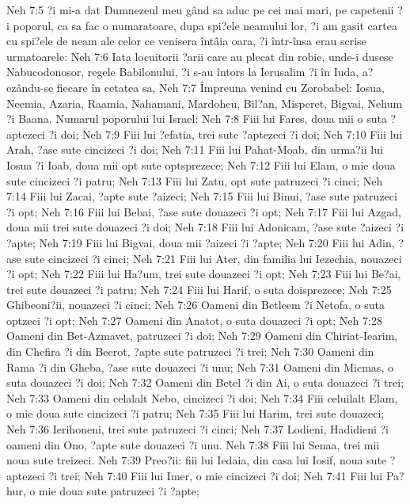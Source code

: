 Neh 7:5  ?i mi-a dat Dumnezeul meu gând sa aduc pe cei mai mari, pe capetenii ?i poporul, ca sa fac o numaratoare, dupa spi?ele neamului lor, ?i am gasit cartea cu spi?ele de neam ale celor ce venisera întâia oara, ?i într-însa erau scrise urmatoarele:
Neh 7:6  Iata locuitorii ?arii care au plecat din robie, unde-i dusese Nabucodonosor, regele Babilonului, ?i s-au întors la Ierusalim ?i în Iuda, a?ezându-se fiecare în cetatea sa,
Neh 7:7  Împreuna venind cu Zorobabel: Iosua, Neemia, Azaria, Raamia, Nahamani, Mardoheu, Bil?an, Misperet, Bigvai, Nehum ?i Baana. Numarul poporului lui Israel:
Neh 7:8  Fiii lui Fares, doua mii o suta ?aptezeci ?i doi;
Neh 7:9  Fiii lui ?efatia, trei sute ?aptezeci ?i doi;
Neh 7:10  Fiii lui Arah, ?ase sute cincizeci ?i doi;
Neh 7:11  Fiii lui Pahat-Moab, din urma?ii lui Iosua ?i Ioab, doua mii opt sute optsprezece;
Neh 7:12  Fiii lui Elam, o mie doua sute cincizeci ?i patru;
Neh 7:13  Fiii lui Zatu, opt sute patruzeci ?i cinci;
Neh 7:14  Fiii lui Zacai, ?apte sute ?aizeci;
Neh 7:15  Fiii lui Binui, ?ase sute patruzeci ?i opt;
Neh 7:16  Fiii lui Bebai, ?ase sute douazeci ?i opt;
Neh 7:17  Fiii lui Azgad, doua mii trei sute douazeci ?i doi;
Neh 7:18  Fiii lui Adonicam, ?ase sute ?aizeci ?i ?apte;
Neh 7:19  Fiii lui Bigvai, doua mii ?aizeci ?i ?apte;
Neh 7:20  Fiii lui Adin, ?ase sute cincizeci ?i cinci;
Neh 7:21  Fiii lui Ater, din familia lui Iezechia, nouazeci ?i opt;
Neh 7:22  Fiii lui Ha?um, trei sute douazeci ?i opt;
Neh 7:23  Fiii lui Be?ai, trei sute douazeci ?i patru;
Neh 7:24  Fiii lui Harif, o suta doisprezece;
Neh 7:25  Ghibeoni?ii, nouazeci ?i cinci;
Neh 7:26  Oameni din Betleem ?i Netofa, o suta optzeci ?i opt;
Neh 7:27  Oameni din Anatot, o suta douazeci ?i opt;
Neh 7:28  Oameni din Bet-Azmavet, patruzeci ?i doi;
Neh 7:29  Oameni din Chiriat-Iearim, din Chefira ?i din Beerot, ?apte sute patruzeci ?i trei;
Neh 7:30  Oameni din Rama ?i din Gheba, ?ase sute douazeci ?i unu;
Neh 7:31  Oameni din Micmas, o suta douazeci ?i doi;
Neh 7:32  Oameni din Betel ?i din Ai, o suta douazeci ?i trei;
Neh 7:33  Oameni din celalalt Nebo, cincizeci ?i doi;
Neh 7:34  Fiii celuilalt Elam, o mie doua sute cincizeci ?i patru;
Neh 7:35  Fiii lui Harim, trei sute douazeci;
Neh 7:36  Ierihoneni, trei sute patruzeci ?i cinci;
Neh 7:37  Lodieni, Hadidieni ?i oameni din Ono, ?apte sute douazeci ?i unu.
Neh 7:38  Fiii lui Senaa, trei mii noua sute treizeci.
Neh 7:39  Preo?ii: fiii lui Iedaia, din casa lui Iosif, noua sute ?aptezeci ?i trei;
Neh 7:40  Fiii lui Imer, o mie cincizeci ?i doi;
Neh 7:41  Fiii lui Pa?hur, o mie doua sute patruzeci ?i ?apte;
